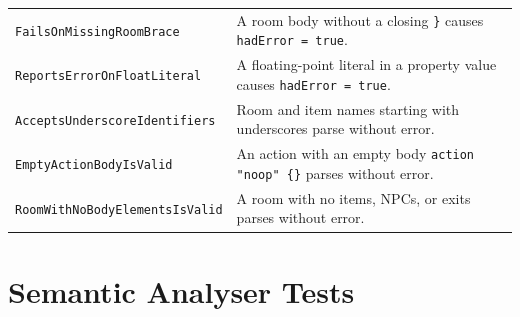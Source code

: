 \documentclass[12pt, a4paper]{article}
\begin{document}
\begin{longtable}{p{6.5cm} p{7cm}}
\texttt{FailsOnMissingRoomBrace} &
  A room body without a closing \texttt{\}} causes \texttt{hadError = true}. \\[4pt]

\texttt{ReportsErrorOnFloatLiteral} &
  A floating-point literal in a property value causes \texttt{hadError = true}. \\[4pt]

\texttt{AcceptsUnderscoreIdentifiers} &
  Room and item names starting with underscores parse without error. \\[4pt]

\texttt{EmptyActionBodyIsValid} &
  An action with an empty body \texttt{action "noop" \{\}} parses without error. \\[4pt]

\texttt{RoomWithNoBodyElementsIsValid} &
  A room with no items, NPCs, or exits parses without error. \\
\bottomrule
\end{longtable}

\section{Semantic Analyser Tests}
\end{document}
